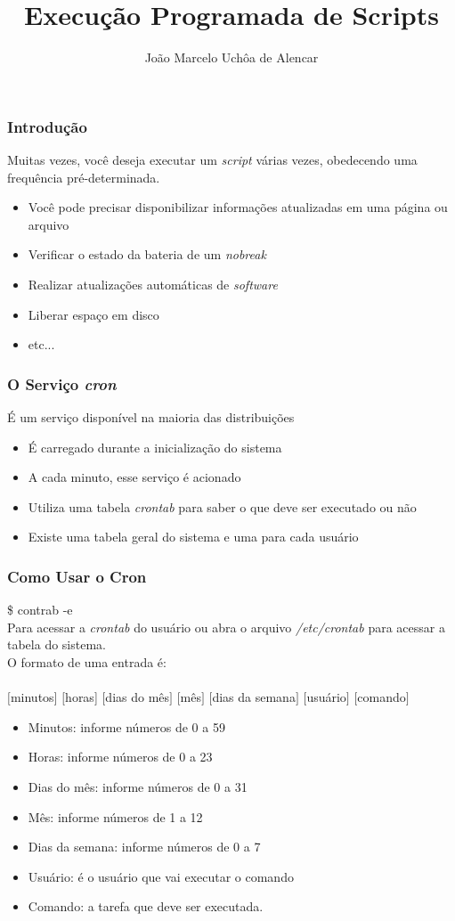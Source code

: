 \documentclass{beamer}
\title{Execução Programada de Scripts}
\author[João Marcelo Uchôa de Alencar]{João Marcelo Uchôa de Alencar}
\institute{Universidade Federal do Ceará - Quixadá}
\begin{document}
   \begin{frame}
      \titlepage
   \end{frame}


   \begin{frame}
      \frametitle{Introdução}
      Muitas vezes, você deseja executar um \textit{script} várias vezes, obedecendo uma frequência pré-determinada.
      \begin{itemize}
         \item Você pode precisar disponibilizar informações atualizadas em uma página ou arquivo
	 \item Verificar o estado da bateria de um \textit{nobreak}
	 \item Realizar atualizações automáticas de \textit{software}
	 \item Liberar espaço em disco
	 \item etc...
      \end{itemize}
   \end{frame}

   \begin{frame}
      \frametitle{O Serviço \textit{cron}}
      É um serviço disponível na maioria das distribuições
      \begin{itemize}
         \item É carregado durante a inicialização do sistema
	 \item A cada minuto, esse serviço é acionado
	 \item Utiliza uma tabela \textit{crontab} para saber o que deve ser executado ou não
	 \item Existe uma tabela geral do sistema e uma para cada usuário
      \end{itemize}
   \end{frame}

   \begin{frame}
      \frametitle{Como Usar o Cron}
      \$ contrab -e \\
      Para acessar a \textit{crontab} do usuário ou abra o arquivo \textit{/etc/crontab} para acessar a tabela do sistema. \\
      O formato de uma entrada é: \\
      \scriptsize \\
      $[$minutos$]$ $[$horas] $[$dias do mês$]$ $[$mês$]$ $[$dias da semana$]$ $[$usuário$]$ $[$comando$]$
      \normalsize \\
      \begin{itemize}
         \item Minutos: informe números de 0 a 59
	 \item Horas: informe números de 0 a 23
	 \item Dias do mês: informe números de 0 a 31
	 \item Mês: informe números de 1 a 12
	 \item Dias da semana: informe números de 0 a 7
	 \item Usuário: é o usuário que vai executar o comando
	 \item Comando: a tarefa que deve ser executada.
      \end{itemize}
   \end{frame}
\end{document}
